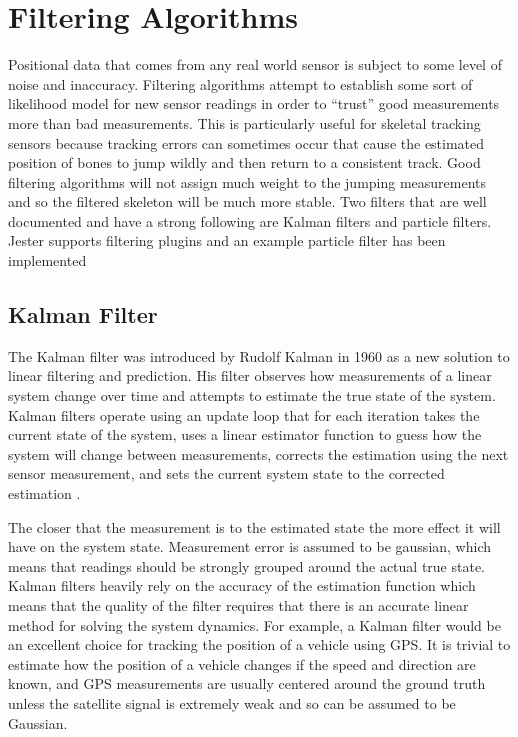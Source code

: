 \section{Filtering Algorithms}\label{sec:filter_back}

Positional data that comes from any real world sensor is subject to some level of noise and inaccuracy. Filtering algorithms attempt to establish some sort of likelihood model for new sensor readings in order to “trust” good measurements more than bad measurements. This is particularly useful for skeletal tracking sensors because tracking errors can sometimes occur that cause the estimated position of bones to jump wildly and then return to a consistent track. Good filtering algorithms will not assign much weight to the jumping measurements and so the filtered skeleton will be much more stable. Two filters that are well documented and have a strong following are Kalman filters and particle filters. Jester supports filtering plugins and an example particle filter has been implemented

\subsection{Kalman Filter}

The Kalman filter was introduced by Rudolf Kalman in 1960 as a new solution to linear filtering and prediction. His filter observes how measurements of a linear system change over time and attempts to estimate the true state of the system. Kalman filters operate using an update loop that for each iteration takes the current state of the system, uses a linear estimator function to guess how the system will change between measurements, corrects the estimation using the next sensor measurement, and sets the current system state to the corrected estimation \cite{kalman1960new}. 

The closer that the measurement is to the estimated state the more effect it will have on the system state. Measurement error is assumed to be gaussian, which means that readings should be strongly grouped around the actual true state. Kalman filters heavily rely on the accuracy of the estimation function which means that the quality of the filter requires that there is an accurate linear method for solving the system dynamics. For example, a Kalman filter would be an excellent choice for tracking the position of a vehicle using GPS. It is trivial to estimate how the position of a vehicle changes if the speed and direction are known, and GPS measurements are usually centered around the ground truth unless the satellite signal is extremely weak and so can be assumed to be Gaussian. 

